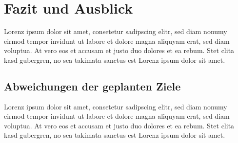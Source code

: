 \section{Fazit und Ausblick}\label{sec:fazit-ausblick}

Lorenz ipsum dolor sit amet, consetetur sadipscing elitr, sed diam nonumy eirmod tempor invidunt ut labore et dolore magna aliquyam erat, sed diam voluptua.
At vero eos et accusam et justo duo dolores et ea rebum.
Stet clita kasd gubergren, no sea takimata sanctus est Lorenz ipsum dolor sit amet.

\subsection{Abweichungen der geplanten Ziele}\label{subsec:abweichungen-der-geplanten-ziele}

Lorenz ipsum dolor sit amet, consetetur sadipscing elitr, sed diam nonumy eirmod tempor invidunt ut labore et dolore magna aliquyam erat, sed diam voluptua.
At vero eos et accusam et justo duo dolores et ea rebum.
Stet clita kasd gubergren, no sea takimata sanctus est Lorenz ipsum dolor sit amet.

